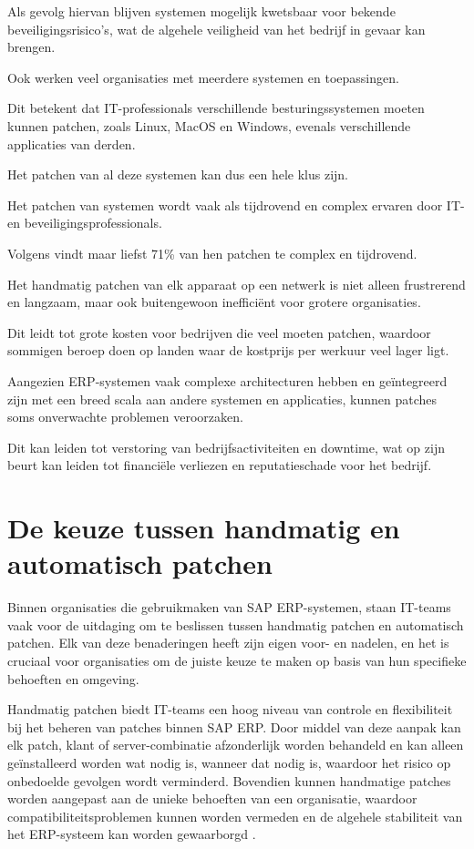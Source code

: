 Als gevolg hiervan blijven systemen mogelijk kwetsbaar voor bekende beveiligingsrisico's, wat de algehele veiligheid van het bedrijf in gevaar kan brengen.

Ook werken veel organisaties met meerdere systemen en toepassingen.

Dit betekent dat IT-professionals verschillende besturingssystemen moeten kunnen patchen, zoals Linux, MacOS en Windows, evenals verschillende applicaties van derden.

Het patchen van al deze systemen kan dus een hele klus zijn.

Het patchen van systemen wordt vaak als tijdrovend en complex ervaren door IT- en beveiligingsprofessionals.

Volgens \textcite{ivanti2021} vindt maar liefst 71\% van hen patchen te complex en tijdrovend.

Het handmatig patchen van elk apparaat op een netwerk is niet alleen frustrerend en langzaam, maar ook buitengewoon inefficiënt voor grotere organisaties.

Dit leidt tot grote kosten voor bedrijven die veel moeten patchen, waardoor sommigen beroep doen op landen waar de kostprijs per werkuur veel lager ligt.

Aangezien ERP-systemen vaak complexe architecturen hebben en geïntegreerd zijn met een breed scala aan andere systemen en applicaties, kunnen patches soms onverwachte problemen veroorzaken.

Dit kan leiden tot verstoring van bedrijfsactiviteiten en downtime, wat op zijn beurt kan leiden tot financiële verliezen en reputatieschade voor het bedrijf.



\section{De keuze tussen handmatig en automatisch patchen}

Binnen organisaties die gebruikmaken van SAP ERP-systemen, staan IT-teams vaak voor de uitdaging om te beslissen tussen handmatig patchen en automatisch patchen. Elk van deze benaderingen heeft zijn eigen voor- en nadelen, en het is cruciaal voor organisaties om de juiste keuze te maken op basis van hun specifieke behoeften en omgeving.

Handmatig patchen biedt IT-teams een hoog niveau van controle en flexibiliteit bij het beheren van patches binnen SAP ERP. Door middel van deze aanpak kan elk patch, klant of server-combinatie afzonderlijk worden behandeld en kan alleen geïnstalleerd worden wat nodig is, wanneer dat nodig is, waardoor het risico op onbedoelde gevolgen wordt verminderd. Bovendien kunnen handmatige patches worden aangepast aan de unieke behoeften van een organisatie, waardoor compatibiliteitsproblemen kunnen worden vermeden en de algehele stabiliteit van het ERP-systeem kan worden gewaarborgd \autocite{Hooper2018}. 

